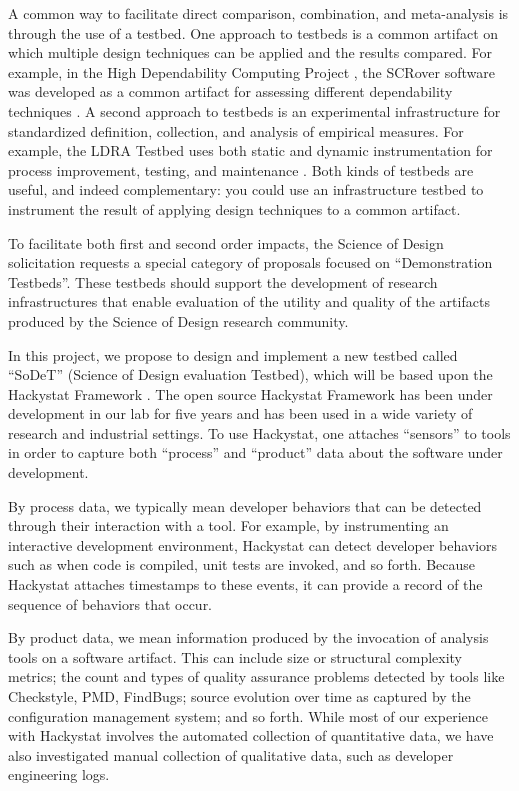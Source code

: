 A common way to facilitate direct comparison, combination, and meta-analysis is
through the use of a testbed.  One approach to testbeds is a common
artifact on which multiple design techniques can be applied and the results
compared.  For example, in the High Dependability Computing Project
\cite{Boehm04}, the SCRover software was developed as a common artifact for
assessing different dependability techniques \cite{Boehm04b}. A second
approach to testbeds is an experimental infrastructure for standardized
definition, collection, and analysis of empirical measures. For example,
the LDRA Testbed uses both static and dynamic instrumentation for process
improvement, testing, and maintenance \cite{Hennel06}.  Both kinds of
testbeds are useful, and indeed complementary: you could use an
infrastructure testbed to instrument the result of applying design
techniques to a common artifact.

To facilitate both first and second order impacts, the Science of
Design solicitation requests a special category of proposals focused on
``Demonstration Testbeds''.  These testbeds should support the development
of research infrastructures that enable evaluation of the utility and
quality of the artifacts produced by the Science of Design research
community.

In this project, we propose to design and implement a new testbed called
``SoDeT'' (Science of Design evaluation Testbed), which will be based
upon the Hackystat Framework \cite{Hackystat}.  The open source Hackystat
Framework has been under development in our lab for five years and has been
used in a wide variety of research and industrial settings. To use 
Hackystat, one attaches ``sensors'' to tools in order to capture
both ``process'' and ``product'' data about the software under development.

By process data, we typically mean developer behaviors that can be detected
through their interaction with a tool.  For example, by instrumenting an
interactive development environment, Hackystat can detect developer
behaviors such as when code is compiled, unit tests are invoked, and so
forth.  Because Hackystat attaches timestamps to these events, it can
provide a record of the sequence of behaviors that occur.

By product data, we mean information produced by the invocation of analysis
tools on a software artifact.  This can include size or structural
complexity metrics; the count and types of quality assurance problems
detected by tools like Checkstyle, PMD, FindBugs; source evolution over
time as captured by the configuration management system; and so
forth. While most of our experience with Hackystat involves the automated
collection of quantitative data, we have also investigated manual
collection of qualitative data, such as developer engineering logs.

